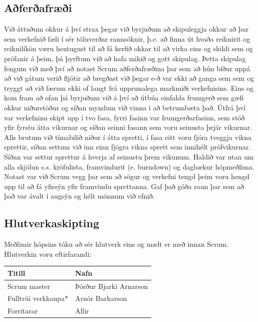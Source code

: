 \documentclass{article}
\begin{document}
\subsection{Aðferðafræði}

Við áttuðum okkur á því strax þegar við byrjuðum að skipuleggja okkur að þar sem
verkefnið fæli í sér töluverðar rannsóknir, þ.e. að finna út hvaða reiknirit og
reiknilíkön væru hentugust til að fá kerfið okkar til að virka eins og skildi
sem og prófanir á þeim, þá þyrftum við að hafa mikið og gott skipulag. Þetta
skipulag fengum við með því að notast Scrum aðferðafræðina þar sem að hún bíður
uppá að við gátum verið fljótir að bregðast við þegar e-ð var ekki að ganga sem
sem og tryggt að við færum ekki of langt frá upprunalega markmiði verkefnisins. 
Eins og kom fram að ofan þá byrjuðum við á því að útbúa einfalda frumgerð sem
gæfi okkur niðurstöður og síðan myndum við vinna í að betrumbæta það. Útfrá því
var verkefninu skipt upp í tvo fasa, fyrri fasinn var frumgerðarfasinn, sem stóð
yfir fyrstu átta vikurnar og síðan seinni fasann sem voru seinusta þrjár
vikurnar. Alls brutum við tímabilið niður í átta spretti, í fasa eitt voru fjóra
tveggja vikna sprettir, síðan settum við inn einn fjögra vikna sprett sem
innihélt prófvikurnar. Síðan var settur sprettur á hverja af seinustu þrem
vikunum.
Haldið var utan um alla skjölun s.s. kröfulista, framvindurit (e. burndown) og
dagbækur hópmeðlima. Notast var við Scrum vegg þar sem að sögur og verkefni
tengd þeim voru hengd upp til að fá yfirsýn yfir framvindu sprettanna. Gaf það
góða raun þar sem að það var ávalt í augsýn og hélt mönnum við efnið.

\subsection{Hlutverkaskipting}

Meðlimir hópsins tóku að sér hlutverk eins og mælt er með innan Scrum.
Hlutverkin voru eftirfarandi:

\vspace{5 mm}
\begin{tabular}{| l | l |}
\hline
Titill & Nafn \\
\hline
Scrum master & Þórður Bjarki Arnarson\\
\hline
Fulltrúi verkkaupa* & Arnór Barkarson \\
\hline
Forritarar & Allir \\
\hline
\end{tabular}
\vspace{5 mm}
\end{document}
